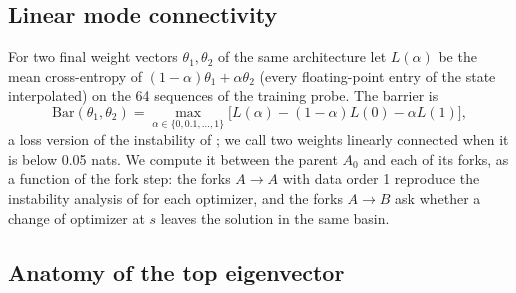 \documentclass[10pt]{article}
\begin{document}
\subsection{Linear mode connectivity}
\label{sec:method-lmc}

For two final weight vectors $\theta_1,\theta_2$ of the same architecture let
$L(\alpha)$ be the mean cross-entropy of $(1-\alpha)\theta_1+\alpha\theta_2$ (every floating-point entry of
the state interpolated) on the 64 sequences of the training probe. The barrier is
\begin{equation}
\mathrm{Bar}(\theta_1,\theta_2)=\max_{\alpha\in\{0,0.1,\dots,1\}}\big[L(\alpha)-(1-\alpha)L(0)-\alpha L(1)\big],
\label{eq:barrier}
\end{equation}
a loss version of the instability of \citet{frankle2020lmc}; we call two weights linearly connected when it
is below 0.05 nats. We compute it between the parent $A_0$ and each
of its forks, as a function of the fork step: the forks $A\to A$ with data order 1 reproduce the instability
analysis of \citet{frankle2020lmc} for each optimizer, and the forks $A\to B$ ask whether a change of
optimizer at $s$ leaves the solution in the same basin.

\subsection{Anatomy of the top eigenvector}
\label{sec:method-anatomy}
\end{document}
